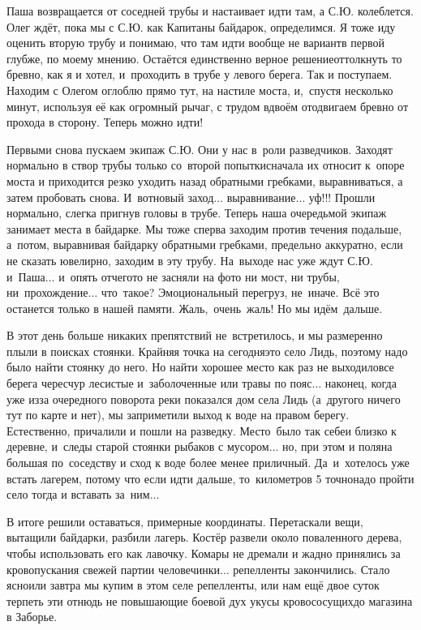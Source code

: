 Паша возвращается от соседней трубы и настаивает идти там, а С.Ю. колеблется. Олег ждёт, пока мы с С.Ю. как Капитаны байдарок, определимся. Я тоже иду оценить вторую трубу и понимаю, что там идти вообще не вариант\mdash в первой глубже, по моему мнению. Остаётся единственно верное решение\mdash оттолкнуть то бревно, как я и хотел, и~проходить в трубе у левого берега. Так и поступаем. Находим с Олегом оглоблю прямо тут, на настиле моста, и,~спустя несколько минут, используя её как огромный рычаг, с трудом вдвоём отодвигаем бревно от прохода в сторону. Теперь можно идти! 

Первыми снова пускаем экипаж С.Ю. Они у нас в~роли разведчиков. Заходят нормально в створ трубы только со~второй попытки\mdash сначала их относит к~опоре моста и приходится резко уходить назад обратными гребками, выравниваться, а затем пробовать снова. И~вот\mdash новый заход$\ldots$ выравнивание$\ldots$ уф!!! Прошли нормально, слегка пригнув головы в трубе. Теперь наша очередь\mdash мой экипаж занимает места в байдарке. Мы тоже сперва заходим против течения подальше, а~потом, выравнивая байдарку обратными гребками, предельно аккуратно, если не сказать ювелирно, заходим в эту трубу. На~выходе нас уже ждут С.Ю. и~Паша$\ldots$ и~опять отчего\sdash то не засняли на фото ни мост, ни трубы, ни~прохождение$\ldots$ что~такое? Эмоциональный перегруз, не~иначе. Всё это останется только в нашей памяти. Жаль,~очень~жаль! Но мы идём~дальше.

В этот день больше никаких препятствий не~встретилось, и мы размеренно плыли в поисках стоянки. Крайняя точка на сегодня\mdash это село Лидь, поэтому надо было найти стоянку до него. Но найти хорошее место как раз не выходило\mdash все берега чересчур лесистые и~заболоченные или травы по пояс$\ldots$ наконец, когда уже из\sdash за очередного поворота реки показался дом села Лидь (а~другого ничего тут по карте и нет), мы заприметили выход к воде на правом берегу. Естественно, причалили и пошли на разведку. Место~было так себе\mdash и близко к деревне, и~следы старой стоянки рыбаков с мусором$\ldots$ но, при этом и поляна большая по~соседству и сход к воде более менее приличный. Да~и~хотелось уже встать лагерем, потому что если идти дальше, то~километров 5 точно\mdash надо пройти село тогда и вставать за~ним$\ldots$

В итоге решили оставаться, примерные координаты\mdash \CoordsLidSeventeenSeloLid. Перетаскали вещи, вытащили байдарки, разбили лагерь. Костёр развели около поваленного дерева, чтобы использовать его как лавочку. Комары не дремали и жадно принялись за кровопускания свежей партии человечинки$\ldots$ репелленты закончились. Стало ясно\mdash или завтра мы купим в этом селе репелленты, или нам ещё двое суток терпеть эти отнюдь не повышающие боевой дух укусы кровососущих\mdash до магазина в Заборье.


